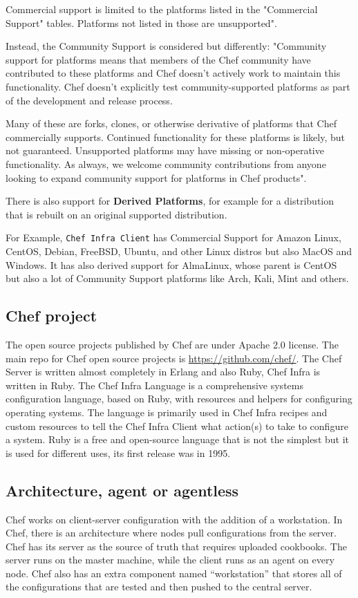 \documentclass[12pt,a4paper,openright,twoside]{book}
\begin{document}
Commercial support is limited to the platforms listed in the "Commercial Support" tables.
Platforms not listed in those are unsupported"\cite{chefDocPlatforms}.

Instead, the Community Support is considered but differently:
"Community support for platforms means that members of the Chef community have contributed to these platforms and Chef doesn't actively work to maintain this functionality. Chef doesn't explicitly test community-supported platforms as part of the development and release process.

Many of these are forks, clones, or otherwise derivative of platforms that Chef commercially supports.
Continued functionality for these platforms is likely, but not guaranteed.
Unsupported platforms may have missing or non-operative functionality.
As always, we welcome community contributions from anyone
looking to expand community support for platforms in Chef products"\cite{chefDocPlatforms}.


There is also support for \textbf{Derived Platforms}, for example for a distribution that is rebuilt on an original supported distribution.

For Example, \texttt{Chef Infra Client} has Commercial Support for Amazon Linux, CentOS, Debian, FreeBSD, Ubuntu, and other Linux distros but also MacOS and Windows.
It has also derived support for AlmaLinux, whose parent is CentOS but also a lot of Community Support platforms like Arch, Kali, Mint and others.

\subsection{Chef project}
The open source projects published by Chef are under Apache 2.0 license.
The main repo for Chef open source projects is \url{https://github.com/chef/}.
The Chef Server is written almost completely in Erlang and also Ruby, Chef Infra is written in Ruby.
The Chef Infra Language is a comprehensive systems configuration language, based on Ruby, with resources and helpers for configuring operating systems. The language is primarily used in Chef Infra recipes and custom resources to tell the Chef Infra Client what action(s) to take to configure a system\cite{chefInfraLanguage}.
Ruby is a free and open-source language that is not the simplest but it is used for different uses, its first release was in 1995.

\subsection{Architecture, agent or agentless}
Chef works on client-server configuration with the addition of a workstation.
In Chef, there is an architecture where nodes pull configurations from the server. Chef has its server as the source of truth that requires uploaded cookbooks.
The server runs on the master machine, while the client runs as an agent on every node. Chef also has an extra component named “workstation” that stores all of the configurations that are tested and then pushed to the central server.
\end{document}
